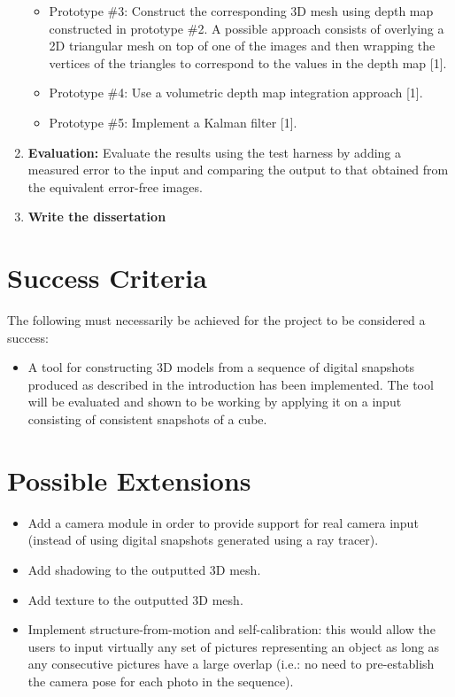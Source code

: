 \begin{enumerate}
\begin{itemize}
	\item Prototype \#{3}: Construct the corresponding 3D mesh using depth map constructed in prototype \#{2}. A possible approach consists of overlying a 2D triangular mesh on top of one of the images and then wrapping the vertices of the triangles to correspond to the values in the depth map [1].
	\item Prototype \#{4}: Use a volumetric depth map integration approach [1].
	\item Prototype \#{5}: Implement a Kalman filter [1].  
	\end{itemize}
\item {\bf Evaluation: } Evaluate the results using the test harness by adding a measured error to the input and comparing the output to that obtained from the equivalent error-free images.
\item {\bf Write the dissertation}     
\end{enumerate}

\section*{Success Criteria}
The following must necessarily be achieved for the project to be considered a success:
\begin{itemize}
\item A tool for constructing 3D models from a sequence of digital snapshots produced as described in the introduction has been implemented. The tool will be evaluated and shown to be working by applying it on a input consisting of consistent snapshots of a cube.
\end{itemize}

\section*{Possible Extensions}
\begin{itemize}
\item Add a camera module in order to provide support for real camera input (instead of using digital snapshots generated using a ray tracer).
\item Add shadowing to the outputted 3D mesh. 
\item Add texture to the outputted 3D mesh.
\item Implement structure-from-motion and self-calibration: this would allow the users to input virtually any set of pictures representing an object as long as any consecutive pictures have a large overlap (i.e.: no need to pre-establish the camera pose for each photo in the sequence).
\end{itemize}

